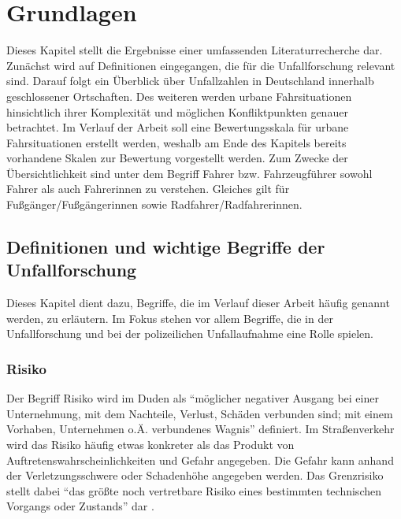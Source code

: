 
\chapter{Grundlagen}\label{chapter:Literaturrecherche}
Dieses Kapitel stellt die Ergebnisse einer umfassenden Literaturrecherche dar. Zunächst wird auf Definitionen eingegangen, die für die Unfallforschung relevant sind. Darauf folgt ein Überblick über Unfallzahlen in Deutschland innerhalb geschlossener Ortschaften. Des weiteren werden urbane Fahrsituationen hinsichtlich ihrer Komplexität und möglichen Konfliktpunkten genauer betrachtet. Im Verlauf der Arbeit soll eine Bewertungsskala für urbane Fahrsituationen erstellt werden, weshalb am Ende des Kapitels bereits vorhandene Skalen zur Bewertung vorgestellt werden. Zum Zwecke der Übersichtlichkeit sind unter dem Begriff Fahrer bzw. Fahrzeugführer sowohl Fahrer als auch Fahrerinnen zu verstehen. Gleiches gilt für Fußgänger/Fußgängerinnen sowie Radfahrer/Radfahrerinnen.

\section{Definitionen und wichtige Begriffe der Unfallforschung}
Dieses Kapitel dient dazu, Begriffe, die im Verlauf dieser Arbeit häufig genannt werden, zu erläutern. Im Fokus stehen vor allem  Begriffe, die in der Unfallforschung und bei der polizeilichen Unfallaufnahme eine Rolle spielen.


\subsection{Risiko}
Der Begriff Risiko wird im Duden als \enquote{möglicher negativer Ausgang bei einer Unternehmung, mit dem Nachteile, Verlust, Schäden verbunden sind; mit einem Vorhaben, Unternehmen o.Ä. verbundenes Wagnis} definiert. Im Straßenverkehr wird das Risiko häufig etwas konkreter als das Produkt von Auftretenswahrscheinlichkeiten und Gefahr angegeben. Die Gefahr kann anhand der Verletzungsschwere \parencite[S. 151f.]{Huguenin.2017} oder Schadenhöhe \parencite[S. 60]{Gschwendtner.2015} angegeben werden. Das Grenzrisiko stellt dabei \enquote{das größte noch vertretbare Risiko eines bestimmten technischen Vorgangs oder Zustands} dar \parencite[S. 43]{Hillenbrand.2012}.

